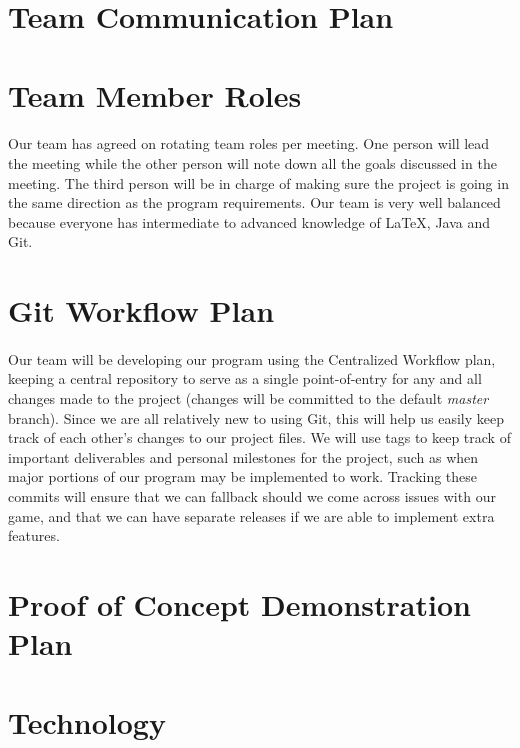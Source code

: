 \documentclass{article}
\begin{document}
\section{Team Communication Plan}

\section{Team Member Roles}

\paragraph{}
Our team has agreed on rotating team roles per meeting. One person will lead the meeting while the other person will note down all the goals discussed in the meeting. The third person will be in charge of making sure the project is going in the same direction as the program requirements. Our team is very well balanced because everyone has intermediate to advanced knowledge of LaTeX, Java and Git.

\section{Git Workflow Plan}

\paragraph{}
Our team will be developing our program using the Centralized Workflow plan, keeping a central repository to serve as a single point-of-entry for any and all changes made to the project (changes will be committed to the default \textit{master} branch). Since we are all relatively new to using Git, this will help us easily keep track of each other's changes to our project files. We will use tags to keep track of important deliverables and personal milestones for the project, such as when major portions of our program may be implemented to work. Tracking these commits will ensure that we can fallback should we come across issues with our game, and that we can have separate releases if we are able to implement extra features.

\section{Proof of Concept Demonstration Plan}

\section{Technology}
\end{document}
